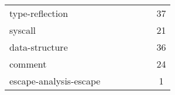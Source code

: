 \begin{table}[h]
\begin{tabularx}{\textwidth}{Xcccccc}
                          type-reflection &          &            &              &               &            &            37 \\
        \rowcolor{verylightgray}
                                  syscall &          &            &              &               &            &            21 \\
                           data-structure &          &            &              &               &            &            36 \\
        \rowcolor{verylightgray}
                                  comment &          &            &              &               &            &            24 \\
                   escape-analysis-escape &          &            &              &               &            &             1 \\
        \bottomrule
    \end{tabularx}
\end{table}

